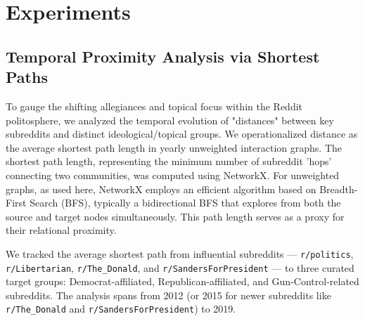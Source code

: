 \documentclass{article}
\begin{document}

\section{Experiments}

\subsection{Temporal Proximity Analysis via Shortest Paths}
To gauge the shifting allegiances and topical focus within the Reddit politosphere, we analyzed the temporal evolution of "distances" between key subreddits and distinct ideological/topical groups. We operationalized distance as the average shortest path length in yearly unweighted interaction graphs. The shortest path length, representing the minimum number of subreddit 'hops' connecting two communities, was computed using NetworkX. For unweighted graphs, as used here, NetworkX employs an efficient algorithm based on Breadth-First Search (BFS), typically a bidirectional BFS that explores from both the source and target nodes simultaneously. This path length serves as a proxy for their relational proximity.

We tracked the average shortest path from influential subreddits --- \texttt{r/politics}, \texttt{r/Libertarian}, \texttt{r/The\_Donald}, and \texttt{r/SandersForPresident} --- to three curated target groups: Democrat-affiliated, Republican-affiliated, and Gun-Control-related subreddits. The analysis spans from 2012 (or 2015 for newer subreddits like \texttt{r/The\_Donald} and \texttt{r/SandersForPresident}) to 2019.
\newpage
\end{document}
